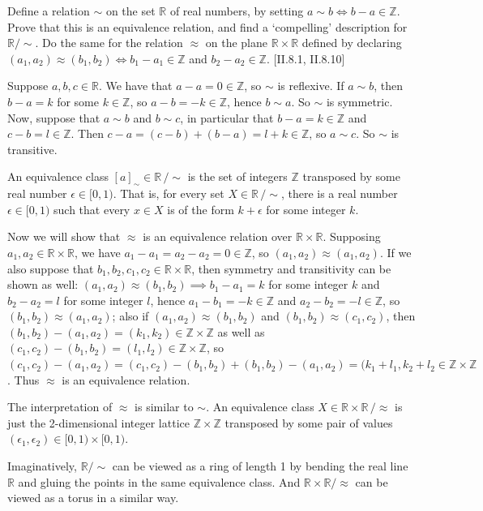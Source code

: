 \documentclass[12pt,letterpaper,boxed]{hmcpset}
\begin{document}
\hypertarget{Exercise I.1.6}{}
\begin{problem}[1.6]
Define a relation $\sim$ on the set $\mathbb{R}$ of real numbers, by setting $a\sim b\iff b-a \in\mathbb{Z}$. Prove that this is an equivalence relation, and find a \textquoteleft compelling' description for $\mathbb{R}/\sim$. Do the same for the relation $\approx$ on the plane $\mathbb{R}\times\mathbb{R}$ defined by declaring $(a_1, a_2)\approx(b_1, b_2)\iff b_1-a_1 \in\mathbb{Z}$ and $b_2-a_2 \in\mathbb{Z}$. [\textsection II.8.1, II.8.10]
\end{problem}
\begin{solution}
Suppose $a,b,c\in\mathbb{R}$. We have that $a-a=0\in\mathbb{Z}$, so $\sim$ is reflexive. If $a\sim b$, then $b-a=k$ for some $k\in\mathbb{Z}$, so $a-b=-k\in\mathbb{Z}$, hence $b\sim a$. So $\sim$ is symmetric. Now, suppose that $a\sim b$ and $b\sim c$, in particular that $b-a=k\in\mathbb{Z}$ and $c-b=l\in\mathbb{Z}$. Then $c-a=(c-b) + (b-a) = l+k\in\mathbb{Z}$, so $a\sim c$. So $\sim$ is transitive.

An equivalence class $[a]_{\sim}\in\mathbb{R}\,/\!\sim$ is the set of integers $\mathbb{Z}$ transposed by some real number $\epsilon\in[0,1)$. That is, for every set $X\in\mathbb{R}\,/\!\sim$, there is a real number $\epsilon\in[0,1)$ such that every $x\in X$ is of the form $k+\epsilon$ for some integer $k$.

Now we will show that $\approx$ is an equivalence relation over $\mathbb{R}\times\mathbb{R}$. Supposing $a_1,a_2\in\mathbb{R}\times\mathbb{R}$, we have $a_1-a_1=a_2-a_2=0\in\mathbb{Z}$, so $(a_1,a_2)\approx(a_1,a_2)$. If we also suppose that $b_1,b_2,c_1,c_2\in\mathbb{R}\times\mathbb{R}$, then symmetry and transitivity can be shown as well: $(a_1,a_2)\approx(b_1,b_2)\implies b_1-a_1=k$ for some integer $k$ and $b_2-a_2=l$ for some integer $l$, hence $a_1-b_1=-k\in\mathbb{Z}$ and $a_2-b_2=-l\in\mathbb{Z}$, so
$(b_1,b_2)\approx(a_1,a_2)$; also if $(a_1,a_2)\approx(b_1,b_2)$ and $(b_1,b_2)\approx(c_1,c_2)$, then
$(b_1,b_2)-(a_1,a_2)=(k_1,k_2)\in\mathbb{Z}\times\mathbb{Z}$ as well as $(c_1,c_2)-(b_1,b_2)=(l_1,l_2)\in\mathbb{Z}\times\mathbb{Z}$, so $(c_1,c_2) - (a_1,a_2) = (c_1,c_2) - (b_1,b_2) + (b_1,b_2) - (a_1,a_2) = (k_1+l_1, k_2+l_2\in\mathbb{Z}\times\mathbb{Z}$. Thus $\approx$ is an equivalence relation.

The interpretation of $\approx$ is similar to $\sim$. An equivalence class $X\in\mathbb{R}\times\mathbb{R}\,/\approx$ is just the 2-dimensional integer lattice $\mathbb{Z}\times\mathbb{Z}$ transposed by some pair of values $(\epsilon_1,\epsilon_2)\in[0,1)\times[0,1)$.

Imaginatively, $\mathbb{R}/\sim$ can be viewed as a ring of length 1 by bending the real line $\mathbb{R}$ and gluing the points in the same equivalence class. And $\mathbb{R}\times\mathbb{R}/\approx$ can be viewed as a torus in a similar way.
\end{solution}
\end{document}
